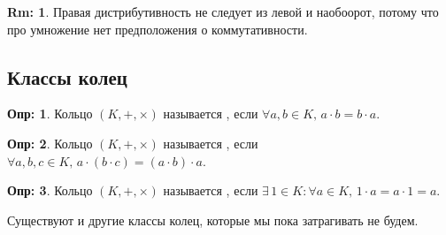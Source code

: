 \documentclass[12pt]{article}
\theoremstyle{definition}
\newtheorem{defn}{Опр:}
\newtheorem{rem}{Rm:}
\begin{document}
\begin{rem}
	Правая дистрибутивность не следует из левой и наобоорот, потому что про умножение нет предположения о коммутативности.
\end{rem}

\subsection*{Классы колец}

\begin{defn}
	Кольцо $(K, +,\times)$ называется , если $\forall a,b \in K, \, a{\cdot}b = b{\cdot}a$.
\end{defn}

\begin{defn}
	Кольцо $(K, +,\times)$ называется , если $\forall a,b,c \in K, \, a{\cdot}(b{\cdot}c) = (a{\cdot}b){\cdot}a$.
\end{defn}

\begin{defn}
	Кольцо $(K, +,\times)$ называется , если $\exists \, 1 \in K \colon \forall a \in K, \, 1{\cdot}a = a{\cdot}1 = a$.
\end{defn}

Существуют и другие классы колец, которые мы пока затрагивать не будем.
\end{document}
